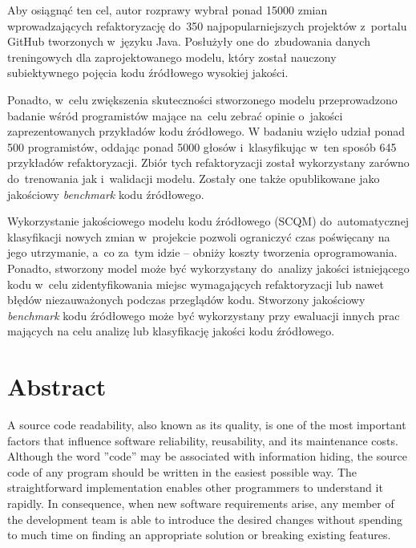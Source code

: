 \documentclass[twoside]{praca}
\newcommand*\cleartoleftpage{%
  \clearpage
  \ifodd\value{page}\hbox{}\newpage\fi
}
\begin{document}
Aby osiągnąć ten cel, autor rozprawy wybrał ponad 15000 zmian wprowadzających refaktoryzację do~350 najpopularniejszych projektów z~portalu GitHub tworzonych w~języku Java. Posłużyły one do~zbudowania danych treningowych dla zaprojektowanego modelu, który został nauczony subiektywnego pojęcia kodu źródłowego wysokiej jakości. 

Ponadto, w~celu zwiększenia skuteczności stworzonego modelu przeprowadzono badanie wśród programistów mające na~celu zebrać opinie o~jakości zaprezentowanych przykładów kodu źródłowego.
W badaniu wzięło udział ponad 500 programistów, oddając ponad 5000 głosów i~klasyfikując w~ten sposób 645 przykładów refaktoryzacji. Zbiór tych refaktoryzacji został wykorzystany zarówno do~trenowania jak i~walidacji modelu. Zostały one także opublikowane jako jakościowy \textit{benchmark} kodu źródłowego. 

Wykorzystanie jakościowego modelu kodu źródłowego (SCQM) do~automatycznej klasyfikacji nowych zmian w~projekcie pozwoli ograniczyć czas poświęcany na jego utrzymanie, a~co za~tym idzie -- obniży koszty tworzenia oprogramowania. Ponadto, stworzony model może być wykorzystany do~analizy jakości istniejącego kodu w~celu zidentyfikowania miejsc wymagających refaktoryzacji lub nawet błędów niezauważonych podczas przeglądów kodu. Stworzony jakościowy \textit{benchmark} kodu źródłowego może być wykorzystany przy ewaluacji innych prac mających na celu analizę lub klasyfikację jakości kodu źródłowego.

\cleartoleftpage

\chapter*{Abstract}

A source code readability, also known as its quality, is one of the most important factors that influence software reliability, reusability, and its maintenance costs. Although the word ''code'' may be associated with information hiding, the source code of any program should be written in the easiest possible way. The straightforward implementation enables other programmers to understand it rapidly. In consequence, when new software requirements arise, any member of the development team is able to introduce the desired changes without spending to much time on finding an appropriate solution or breaking existing features.
\end{document}
